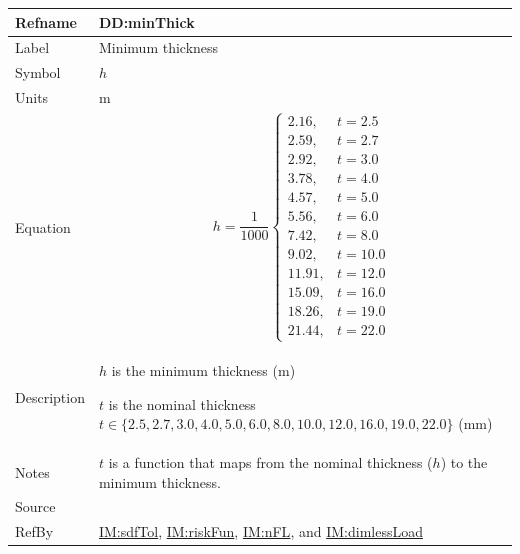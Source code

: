 \documentclass[12pt]{article}
\begin{document}
\medskip
\noindent
\begin{minipage}{\textwidth}
\begin{tabular}{>{\raggedright}p{}>{\raggedright\arraybackslash}p{}}
\toprule \textbf{Refname} & \textbf{DD:minThick}
\label{DD:minThick}
\\ \midrule
Label & Minimum thickness
        
\\ \midrule
Symbol & $h$
         
\\ \midrule
Units & ${\text{m}}$
        
\\ \midrule
Equation & \begin{displaymath}
           h=\frac{1}{1000} \begin{cases}
                            2.16, & t=2.5\\
                            2.59, & t=2.7\\
                            2.92, & t=3.0\\
                            3.78, & t=4.0\\
                            4.57, & t=5.0\\
                            5.56, & t=6.0\\
                            7.42, & t=8.0\\
                            9.02, & t=10.0\\
                            11.91, & t=12.0\\
                            15.09, & t=16.0\\
                            18.26, & t=19.0\\
                            21.44, & t=22.0
                            \end{cases}
           \end{displaymath}
\\ \midrule
Description & \begin{symbDescription}
              \item{$h$ is the minimum thickness (${\text{m}}$)}
              \item{$t$ is the nominal thickness $t\in{}\{2.5,2.7,3.0,4.0,5.0,6.0,8.0,10.0,12.0,16.0,19.0,22.0\}$ (${\text{mm}}$)}
              \end{symbDescription}
\\ \midrule
Notes & $t$ is a function that maps from the nominal thickness ($h$) to the minimum thickness.
        
\\ \midrule
Source & \cite{astm2009}
         
\\ \midrule
RefBy & \hyperref[IM:sdfTol]{IM:sdfTol}, \hyperref[IM:riskFun]{IM:riskFun}, \hyperref[IM:nFL]{IM:nFL}, and \hyperref[IM:dimlessLoad]{IM:dimlessLoad}
        
\\ \bottomrule
\end{tabular}
\end{minipage}
\end{document}
